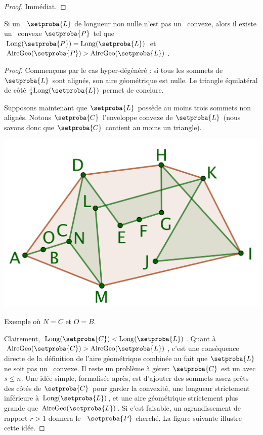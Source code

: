 \begin{proof}
	Immédiat.
\end{proof}




\begin{fact} \label{max-is-nconv}
    Si un \ncycle\ $\setproba{L}$ de longueur non nulle n'est pas un \ngone\ convexe, alors il existe un \ngone\ convexe $\setproba{P}$ tel que
	$\cyclelen{\setproba{P}} = \cyclelen{\setproba{L}}$
	et
	$\geoarea{\setproba{P}} > \geoarea{\setproba{L}}$.
\end{fact}


\begin{proof}
	Commençons par le cas \og hyper-dégénéré \fg: si tous les sommets de $\setproba{L}$ sont alignés, son aire géométrique est nulle. Le triangle équilatéral de côté $\frac13 \cyclelen{\setproba{L}}$ permet de conclure.
	
	Supposons maintenant que $\setproba{L}$ possède au moins trois sommets non alignés.
	Notons $\setproba{C}$ l'enveloppe convexe de $\setproba{L}$ (nous savons donc que $\setproba{C}$ contient au moins un triangle).
	
	\begin{center}
		\centering
		\small\itshape
		\includegraphics[scale=.45]{content/polygon/geo-area/convex-hull.png}
		
		\smallskip
		Exemple où $N = C$ et $O = B$.
	\end{center}
	
		
	Clairement, $\cyclelen{\setproba{C}} < \cyclelen{\setproba{L}}$.
	Quant à $\geoarea{\setproba{C}} > \geoarea{\setproba{L}}$, c'est une conséquence directe de la définition de l'aire géométrique combinée au fait que $\setproba{L}$ ne soit pas un \ngone\ convexe.
	Il reste un problème à gérer: $\setproba{C}$ est un  avec $s \leq n$. 
	Une idée simple, formalisée après, est d'ajouter des sommets assez prêts des côtés de $\setproba{C}$ pour garder la convexité, une longueur strictement inférieure à $\cyclelen{\setproba{L}}$, et une aire géométrique strictement plus grande que $\geoarea{\setproba{L}}$. Si c'est faisable, un agrandissement de rapport $r > 1$ donnera le \ngone\ $\setproba{P}$ cherché.
	La figure suivante illustre cette idée.


\end{proof}
